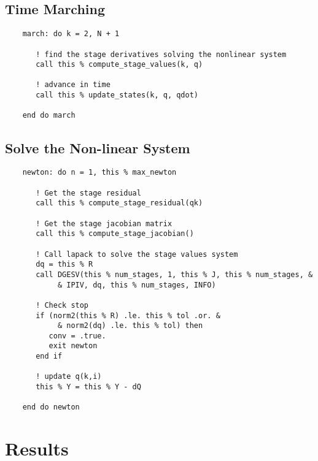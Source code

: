 \documentclass[pdftex,11pt,letter]{article}
\begin{document}
\subsection{Time Marching}

\begin{verbatim}
    march: do k = 2, N + 1

       ! find the stage derivatives solving the nonlinear system
       call this % compute_stage_values(k, q)
        
       ! advance in time
       call this % update_states(k, q, qdot)

    end do march
\end{verbatim}


\subsection{Solve the Non-linear System}

\begin{verbatim}
    newton: do n = 1, this % max_newton
       
       ! Get the stage residual
       call this % compute_stage_residual(qk)
       
       ! Get the stage jacobian matrix
       call this % compute_stage_jacobian()

       ! Call lapack to solve the stage values system
       dq = this % R
       call DGESV(this % num_stages, 1, this % J, this % num_stages, &
            & IPIV, dq, this % num_stages, INFO)

       ! Check stop
       if (norm2(this % R) .le. this % tol .or. &
            & norm2(dq) .le. this % tol) then
          conv = .true.
          exit newton
       end if
       
       ! update q(k,i)
       this % Y = this % Y - dQ
       
    end do newton
\end{verbatim}

\section{Results}
\end{document}
